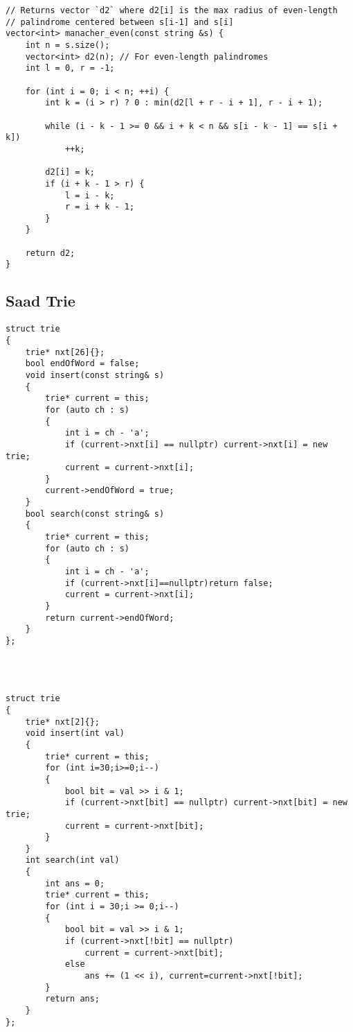{\begin{lstlisting}[style=cpp]
// Returns vector `d2` where d2[i] is the max radius of even-length
// palindrome centered between s[i-1] and s[i]
vector<int> manacher_even(const string &s) {
    int n = s.size();
    vector<int> d2(n); // For even-length palindromes
    int l = 0, r = -1;

    for (int i = 0; i < n; ++i) {
        int k = (i > r) ? 0 : min(d2[l + r - i + 1], r - i + 1);

        while (i - k - 1 >= 0 && i + k < n && s[i - k - 1] == s[i + k])
            ++k;

        d2[i] = k;
        if (i + k - 1 > r) {
            l = i - k;
            r = i + k - 1;
        }
    }

    return d2;
}
\end{lstlisting}

\subsection{Saad Trie}

\begin{lstlisting}[style=cpp]
struct trie
{
    trie* nxt[26]{};
    bool endOfWord = false;
    void insert(const string& s)
    {
        trie* current = this;
        for (auto ch : s)
        {
            int i = ch - 'a';
            if (current->nxt[i] == nullptr) current->nxt[i] = new trie;
            current = current->nxt[i];
        }
        current->endOfWord = true;
    }
    bool search(const string& s)
    {
        trie* current = this;
        for (auto ch : s)
        {
            int i = ch - 'a';
            if (current->nxt[i]==nullptr)return false;
            current = current->nxt[i];
        }
        return current->endOfWord;
    }
};




struct trie
{
    trie* nxt[2]{};
    void insert(int val)
    {
        trie* current = this;
        for (int i=30;i>=0;i--)
        {
            bool bit = val >> i & 1;
            if (current->nxt[bit] == nullptr) current->nxt[bit] = new trie;
            current = current->nxt[bit];
        }
    }
    int search(int val)
    {
        int ans = 0;
        trie* current = this;
        for (int i = 30;i >= 0;i--)
        {
            bool bit = val >> i & 1;
            if (current->nxt[!bit] == nullptr)
                current = current->nxt[bit];
            else
                ans += (1 << i), current=current->nxt[!bit];
        }
        return ans;
    }
};
\end{lstlisting}

}
